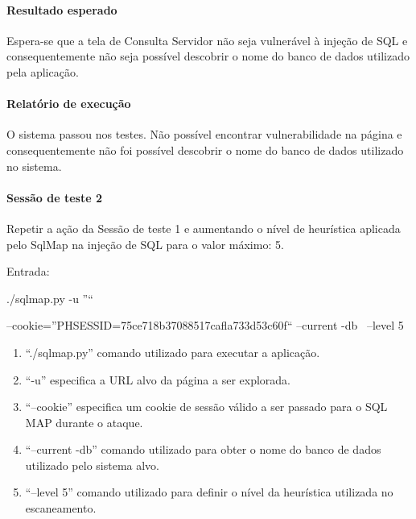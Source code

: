 \documentclass[
    12pt,               %
    openright,          %
    oneside,            %
    a4paper,            %
    section=TITLE,     %
    english,            %
    french,             %
    spanish,            %
    brazil              %
    ]{abntex2}
\begin{document}
\paragraph*{Resultado esperado}

Espera-se que a tela de Consulta Servidor não seja vulnerável à injeção de SQL e consequentemente não seja possível descobrir o nome do banco de dados utilizado pela aplicação.



\paragraph*{Relatório de execução}

O sistema passou nos testes. Não possível encontrar vulnerabilidade na página e consequentemente não foi possível descobrir o nome do banco de dados utilizado no sistema.



\paragraph*{Sessão de teste 2}

Repetir a ação da Sessão de teste 1 e aumentando o nível de heurística aplicada pelo SqlMap na injeção de SQL para o valor máximo: 5.


Entrada:


./sqlmap.py -u ''``


--cookie=''PHSESSID=75ce718b37088517cafla733d53c60f`` --current -db~ --level 5



\begin{enumerate}[start=1]
	
\item \textquotedblleft{}./sqlmap.py\textquotedblright{} comando utilizado para executar a aplicação.
	
\item \textquotedblleft{}-u\textquotedblright{} especifica a URL alvo da página a ser explorada.
	
\item \textquotedblleft{}--cookie\textquotedblright{} especifica um cookie de sessão válido a ser passado para o SQL MAP durante o ataque.
	
\item \textquotedblleft{}--current -db\textquotedblright{} comando utilizado para obter o nome do banco de dados utilizado pelo sistema alvo.
	
\item \textquotedblleft{}--level 5\textquotedblright{} comando utilizado para definir o nível da heurística utilizada no escaneamento.

\end{enumerate}
\end{document}
